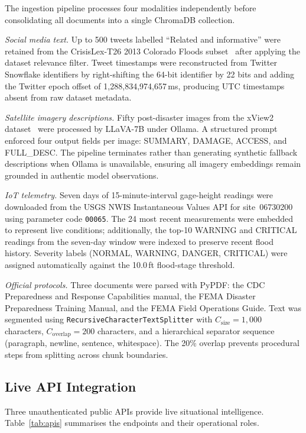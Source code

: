 \documentclass[conference]{IEEEtran}
\begin{document}
The ingestion pipeline processes four modalities independently before
consolidating all documents into a single ChromaDB collection.

\textit{Social media text.} Up to 500 tweets labelled ``Related and
informative'' were retained from the CrisisLex-T26 2013 Colorado Floods
subset~\cite{b21} after applying the dataset relevance filter. Tweet timestamps
were reconstructed from Twitter Snowflake identifiers by right-shifting the
64-bit identifier by 22 bits and adding the Twitter epoch offset of
1{,}288{,}834{,}974{,}657\,ms, producing UTC timestamps absent from raw
dataset metadata.

\textit{Satellite imagery descriptions.} Fifty post-disaster images from the
xView2 dataset~\cite{b22} were processed by LLaVA-7B under Ollama. A structured
prompt enforced four output fields per image: SUMMARY, DAMAGE, ACCESS, and
FULL\_DESC. The pipeline terminates rather than generating synthetic fallback
descriptions when Ollama is unavailable, ensuring all imagery embeddings remain
grounded in authentic model observations.

\textit{IoT telemetry.} Seven days of 15-minute-interval gage-height readings
were downloaded from the USGS NWIS Instantaneous Values API for site~06730200
using parameter code \texttt{00065}. The 24 most recent measurements were
embedded to represent live conditions; additionally, the top-10 WARNING and
CRITICAL readings from the seven-day window were indexed to preserve recent
flood history. Severity labels (NORMAL, WARNING, DANGER, CRITICAL) were
assigned automatically against the 10.0\,ft flood-stage threshold.

\textit{Official protocols.} Three documents were parsed with PyPDF: the CDC
Preparedness and Response Capabilities manual, the FEMA Disaster Preparedness
Training Manual, and the FEMA Field Operations Guide. Text was segmented using
\texttt{RecursiveCharacterTextSplitter} with $C_{\text{size}}{=}1{,}000$
characters, $C_{\text{overlap}}{=}200$ characters, and a hierarchical separator
sequence (paragraph, newline, sentence, whitespace). The 20\% overlap prevents
procedural steps from splitting across chunk boundaries.

\subsection{Live API Integration}

Three unauthenticated public APIs provide live situational intelligence.
Table~\ref{tab:apis} summarises the endpoints and their operational roles.
\end{document}
